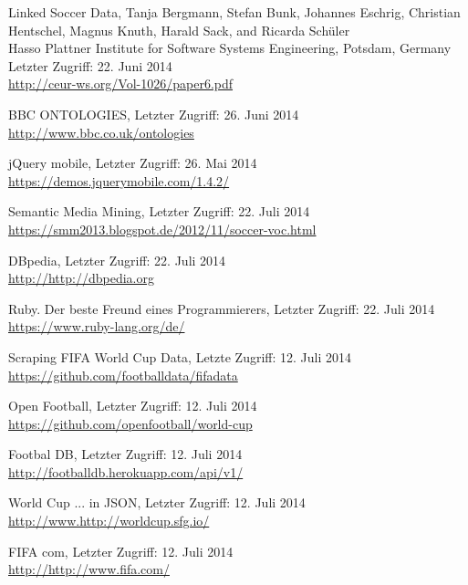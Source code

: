 \documentclass[runningheads,a4paper]{llncs}
\begin{document}
\begin{thebibliography}{4}

Linked Soccer Data,
Tanja Bergmann, Stefan Bunk, Johannes Eschrig, Christian Hentschel, Magnus Knuth, Harald Sack, and Ricarda Schüler\\
Hasso Plattner Institute for Software Systems Engineering, Potsdam, Germany\\
Letzter Zugriff: 22. Juni 2014\\
\url{http://ceur-ws.org/Vol-1026/paper6.pdf}

BBC ONTOLOGIES,
Letzter Zugriff: 26. Juni 2014\\
\url{http://www.bbc.co.uk/ontologies}

jQuery mobile,
Letzter Zugriff: 26. Mai 2014\\
\url{https://demos.jquerymobile.com/1.4.2/}

Semantic Media Mining,
Letzter Zugriff: 22. Juli 2014\\
\url{https://smm2013.blogspot.de/2012/11/soccer-voc.html}

DBpedia,
Letzter Zugriff: 22. Juli 2014\\
\url{http://http://dbpedia.org}

Ruby. Der beste Freund eines Programmierers,
Letzter Zugriff: 22. Juli 2014\\
\url{https://www.ruby-lang.org/de/}

Scraping FIFA World Cup Data,
Letzte Zugriff: 12. Juli 2014\\
\url{https://github.com/footballdata/fifadata}

Open Football,
Letzter Zugriff: 12. Juli 2014\\
\url{https://github.com/openfootball/world-cup}

Footbal DB,
Letzter Zugriff: 12. Juli 2014\\
\url{http://footballdb.herokuapp.com/api/v1/}

World Cup ... in JSON,
Letzter Zugriff: 12. Juli 2014\\
\url{http://www.http://worldcup.sfg.io/}

FIFA com,
Letzter Zugriff: 12. Juli 2014\\
\url{http://http://www.fifa.com/}

\end{thebibliography}
\end{document}
